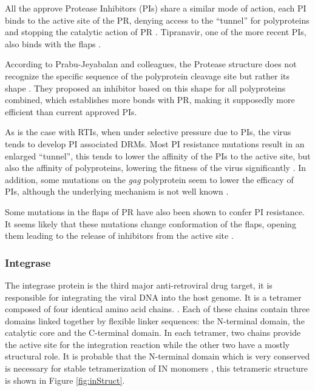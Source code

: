 \documentclass[
  11pt,
  twoside,
  BCOR=10mm,
  listof=totoc]{scrbook}
\begin{document}
All the approve Protease Inhibitors (PIs) share a similar mode of action, each PI binds to the active site of the PR, denying access to the ``tunnel'' for polyproteins and stopping the catalytic action of PR \autocite{robertsRationalDesignPeptideBased1990,lvHIVProteaseInhibitors2015}. Tipranavir, one of the more recent PIs, also binds with the flaps \autocite{lvHIVProteaseInhibitors2015}.

According to Prabu-Jeyabalan and colleagues, the Protease structure does not recognize the specific sequence of the polyprotein cleavage site but rather its shape \autocite{prabu-jeyabalanSubstrateShapeDetermines2002}. They proposed an inhibitor based on this shape for all polyproteins combined, which establishes more bonds with PR, making it supposedly more efficient \autocite{prabu-jeyabalanSubstrateEnvelopeDrug2006} than current approved PIs.

As is the case with RTIs, when under selective pressure due to PIs, the virus tends to develop PI associated DRMs. Most PI resistance mutations result in an enlarged ``tunnel'', this tends to lower the affinity of the PIs to the active site, but also the affinity of polyproteins, lowering the fitness of the virus significantly \autocite{wensingFifteenYearsHIV2010}. In addition, some mutations on the \emph{gag} polyprotein seem to lower the efficacy of PIs, although the underlying mechanism is not well known \autocite{wensingFifteenYearsHIV2010}.

Some mutations in the flaps of PR have also been shown to confer PI resistance. It seems likely that these mutations change conformation of the flaps, opening them leading to the release of inhibitors from the active site \autocite{kurtyilmazImprovingViralProtease2016}.

\hypertarget{integrase}{%
\subsubsection{Integrase}\label{integrase}}

The integrase protein is the third major anti-retroviral drug target, it is responsible for integrating the viral DNA into the host genome. It is a tetramer composed of four identical amino acid chains. \autocite{chiuStructureFunctionHIV12004,espositoHIVIntegraseStructure1999}. Each of these chains contain three domains linked together by flexible linker sequences: the N-terminal domain, the catalytic core and the C-terminal domain. In each tetramer, two chains provide the active site for the integration reaction while the other two have a mostly structural role. It is probable that the N-terminal domain which is very conserved is necessary for stable tetramerization of IN monomers \autocite{delelisIntegraseIntegrationBiochemical2008}, this tetrameric structure is shown in Figure \ref{fig:inStruct}.
\end{document}

